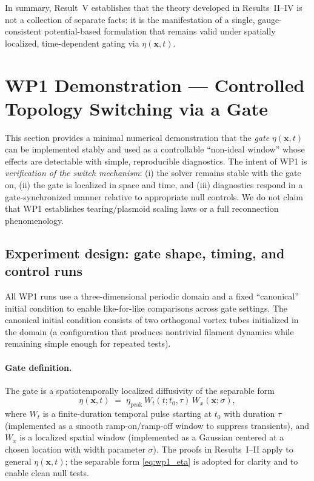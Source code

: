 \documentclass[11pt]{article}
\theoremstyle{plain}
\theoremstyle{definition}
\theoremstyle{remark}
\begin{document}
In summary, Result~V establishes that the theory developed in Results~II--IV is not a collection of
separate facts: it is the manifestation of a single, gauge-consistent potential-based formulation that
remains valid under spatially localized, time-dependent gating via $\eta(\mathbf{x},t)$.

\section{WP1 Demonstration --- Controlled Topology Switching via a Gate}\label{sec:wp1_demo}

This section provides a minimal numerical demonstration that the \emph{gate} $\eta(\mathbf{x},t)$ can be
implemented stably and used as a controllable ``non-ideal window'' whose effects are detectable with
simple, reproducible diagnostics. The intent of WP1 is \emph{verification of the switch mechanism}:
(i) the solver remains stable with the gate on, (ii) the gate is localized in space and time, and
(iii) diagnostics respond in a gate-synchronized manner relative to appropriate null controls.
We do not claim that WP1 establishes tearing/plasmoid scaling laws or a full reconnection phenomenology.

\subsection{Experiment design: gate shape, timing, and control runs}\label{sec:wp1_design}
All WP1 runs use a three-dimensional periodic domain and a fixed ``canonical'' initial condition to
enable like-for-like comparisons across gate settings. The canonical initial condition consists of two
orthogonal vortex tubes initialized in the domain (a configuration that produces nontrivial filament
dynamics while remaining simple enough for repeated tests).

\paragraph{Gate definition.}
The gate is a spatiotemporally localized diffusivity of the separable form
\begin{equation}\label{eq:wp1_eta}
  \eta(\mathbf{x},t)
  \;=\;
  \eta_{\text{peak}}\,
  W_t(t;t_0,\tau)\,
  W_x(\mathbf{x};\sigma),
\end{equation}
where $W_t$ is a finite-duration temporal pulse starting at $t_0$ with duration $\tau$ (implemented as a
smooth ramp-on/ramp-off window to suppress transients), and $W_x$ is a localized spatial window
(implemented as a Gaussian centered at a chosen location with width parameter $\sigma$). The proofs in
Results~I--II apply to general $\eta(\mathbf{x},t)$; the separable form \eqref{eq:wp1_eta} is adopted
for clarity and to enable clean null tests.
\end{document}
